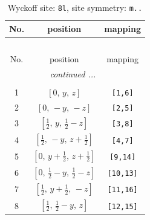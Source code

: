 \documentclass[fleqn,8pt]{jsarticle}
\begin{document}
\begin{longtable}{ccc}
\caption{Wyckoff site: {\tt 8l}, site symmetry: {\tt m..}}
 \\
 \hline \hline
No. & position & mapping \\ \hline \endfirsthead

\multicolumn{2}{l}{\tablename\ \thetable{}} \\
 \hline \hline
No. & position & mapping \\ \hline \endhead

 \hline \hline
\multicolumn{2}{r}{\footnotesize\it continued ...} \\ \endfoot

 \hline \hline
\multicolumn{2}{r}{} \\ \endlastfoot

1 & $\left[ 0,\, y,\, z \right]$ & {\tt [1,6]} \\ \hline
2 & $\left[ 0,\, - y,\, - z \right]$ & {\tt [2,5]} \\ \hline
3 & $\left[ \frac{1}{2},\, y,\, \frac{1}{2} - z \right]$ & {\tt [3,8]} \\ \hline
4 & $\left[ \frac{1}{2},\, - y,\, z + \frac{1}{2} \right]$ & {\tt [4,7]} \\ \hline
5 & $\left[ 0,\, y + \frac{1}{2},\, z + \frac{1}{2} \right]$ & {\tt [9,14]} \\ \hline
6 & $\left[ 0,\, \frac{1}{2} - y,\, \frac{1}{2} - z \right]$ & {\tt [10,13]} \\ \hline
7 & $\left[ \frac{1}{2},\, y + \frac{1}{2},\, - z \right]$ & {\tt [11,16]} \\ \hline
8 & $\left[ \frac{1}{2},\, \frac{1}{2} - y,\, z \right]$ & {\tt [12,15]} \\
\end{longtable}
\renewcommand{\arraystretch}{1.2}
\end{document}
